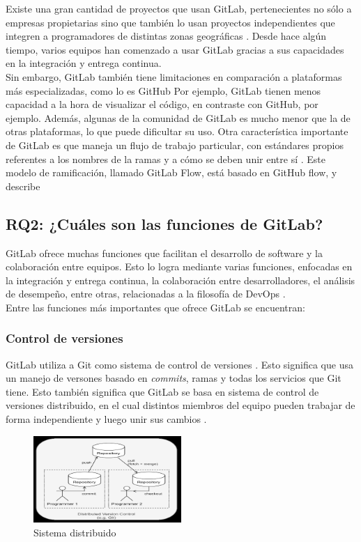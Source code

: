 \documentclass[runningheads]{llncs}
\begin{document}
Existe una gran cantidad de proyectos que usan GitLab, pertenecientes no sólo a empresas propietarias
sino que también lo usan proyectos independientes que integren a programadores de distintas zonas
geográficas \cite{safari2020structural}. Desde hace algún tiempo, varios equipos han comenzado a usar GitLab
gracias a sus capacidades en la integración y entrega continua.\\
Sin embargo, GitLab también tiene limitaciones en comparación a plataformas más especializadas, como lo es GitHub
Por ejemplo, GitLab tienen menos capacidad a la hora de visualizar el código, en contraste con GitHub, por ejemplo.
Además, algunas de la comunidad de GitLab es mucho menor que la de otras plataformas, lo que puede dificultar su uso.
Otra característica importante de GitLab es que maneja un flujo de trabajo particular, con estándares propios referentes
a los nombres de la ramas y a cómo se deben unir entre sí \cite{devineni1version}. Este modelo de ramificación, llamado
GitLab Flow, está basado en GitHub flow, y describe 
\subsection{RQ2: ¿Cuáles son las funciones de GitLab?}
GitLab ofrece muchas funciones que facilitan el desarrollo de software y la colaboración entre equipos. Esto lo
logra mediante varias funciones, enfocadas en la integración y entrega continua, la colaboración entre desarrolladores,
el análisis de desempeño, entre otras, relacionadas a la filosofía de DevOps \cite{fairbanks2023analyzing}.\\
Entre las funciones más importantes que ofrece GitLab se encuentran:
\subsubsection{Control de versiones}
GitLab utiliza a Git como sistema de control de versiones \cite{choudhury2020gitlab}. Esto significa que usa un
manejo de versones basado en \textit{commits}, ramas y todas los servicios que Git tiene. Esto también significa que GitLab
se basa en sistema de control de versiones distribuido, en el cual distintos miembros del equipo pueden trabajar
de forma independiente y luego unir sus cambios \cite{alvin2023devops}.
\begin{figure}[htbp]
        \centering
        \includegraphics[width=0.5\textwidth]{Distributed.png}
        \caption{Sistema distribuido}
        \label{fig:sys-dis}
\end{figure}
\end{document}

